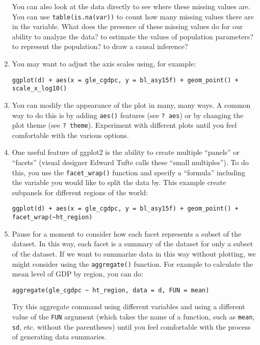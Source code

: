 \documentclass[a4paper,12pt]{article}
\begin{document}
\begin{enumerate}
\noindent You can also look at the data directly to see where these missing values are. You can use \texttt{table(is.na(\textit{var}))} to count how many missing values there are in the variable. What does the presence of these missing values do for our ability to analyze the data? to estimate the values of population parameters? to represent the population? to draw a causal inference?

\item You may want to adjust the axis scales using, for example:

\begin{verbatim}
ggplot(d) + aes(x = gle_cgdpc, y = bl_asy15f) + geom_point() + scale_x_log10()
\end{verbatim}

\item You can modify the appearance of the plot in many, many ways. A common way to do this is by adding \texttt{aes()} features (see \texttt{? aes}) or by changing the plot theme (see \texttt{? theme}). Experiment with different plots until you feel comfortable with the various options.

\item One useful feature of ggplot2 is the ability to create multiple ``panels'' or ``facets'' (visual designer Edward Tufte calls these ``small multiples''). To do this, you use the \texttt{facet\_wrap()} function and specify a ``formula'' including the variable you would like to split the data by. This example create subpanels for different regions of the world:

\begin{verbatim}
ggplot(d) + aes(x = gle_cgdpc, y = bl_asy15f) + geom_point() + facet_wrap(~ht_region)
\end{verbatim}

\item Pause for a moment to consider how each facet represents a subset of the dataset. In this way, each facet is a summary of the dataset for only a subset of the dataset. If we want to summarize data in this way without plotting, we might consider using the \texttt{aggregate()} function. For example to calculate the mean level of GDP by region, you can do:

\begin{verbatim}
aggregate(gle_cgdpc ~ ht_region, data = d, FUN = mean)
\end{verbatim}

\noindent Try this aggregate command using different variables and using a different value of the \texttt{FUN} argument (which takes the name of a function, such as \texttt{mean}, \texttt{sd}, etc. without the parentheses) until you feel comfortable with the process of generating data summaries.


\end{enumerate}
\end{document}
